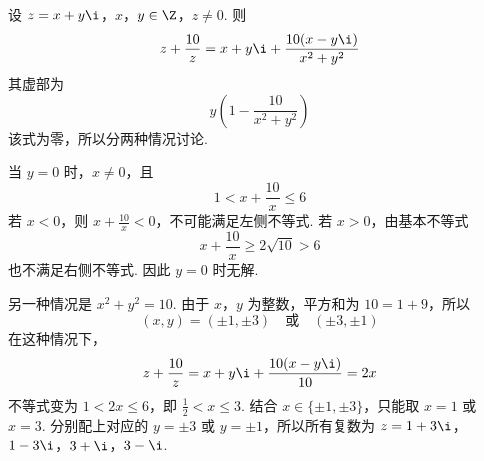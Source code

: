 \documentclass[UTF8,a4paper,oneside,11pt]{ctexbook}
\begin{document}
\begin{solution}
设
\(z=x+y\i\)，\(x\)，\(y\in\Z\)，\(z\ne0\).
则
\[
z+\frac{10}{z}=x+y\i+\frac{10(x-y\i)}{x^2+y^2}
\]
其虚部为
\[
y\left(1-\frac{10}{x^2+y^2}\right)
\]
该式为零，所以分两种情况讨论.

当 \(y=0\) 时，\(x\ne0\)，且
\[
1<x+\frac{10}{x}\leqslant6
\]
若 \(x<0\)，则 \(x+\frac{10}{x}<0\)，不可能满足左侧不等式. 若 \(x>0\)，由基本不等式
\[
x+\frac{10}{x}\geqslant2\sqrt{10}>6
\]
也不满足右侧不等式. 因此 \(y=0\) 时无解.

另一种情况是 \(x^2+y^2=10\). 由于 \(x\)，\(y\) 为整数，平方和为 \(10=1+9\)，所以
\[
(x,y)=(\pm1,\pm3)\quad\text{或}\quad(\pm3,\pm1)
\]
在这种情况下，
\[
z+\frac{10}{z}=x+y\i+\frac{10(x-y\i)}{10}=2x
\]
不等式变为 \(1<2x\leqslant6\)，即 \(\frac12<x\leqslant3\). 结合 \(x\in\{\pm1,\pm3\}\)，只能取 \(x=1\) 或 \(x=3\). 分别配上对应的 \(y=\pm3\) 或 \(y=\pm1\)，所以所有复数为
\(z=1+3\i\)，\(1-3\i\)，\(3+\i\)，\(3-\i\).
\end{solution}

\end{document}
